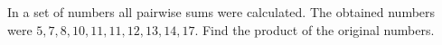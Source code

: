 In a set of numbers all pairwise sums were calculated. The obtained numbers were $5, 7, 8, 10, 11, 11, 12, 13, 14, 17$. Find the product of the original numbers.
